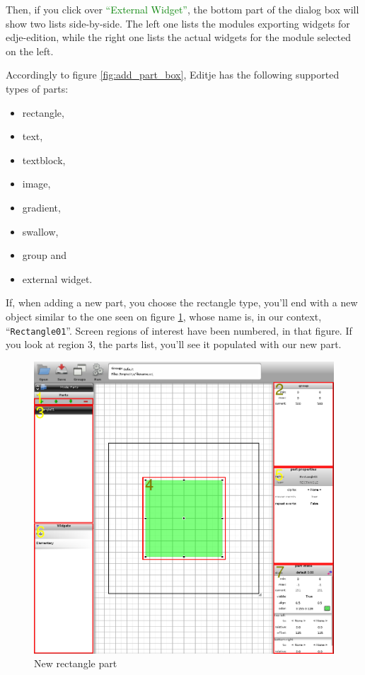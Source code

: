 \documentclass[a4paper]{profusion}
\newcommand{\GUIButton}[1]{\textcolor{green}{#1}} %
\begin{document}
Then, if you click over \GUIButton{``External Widget''}, the bottom
part of the dialog box will show two lists side-by-side. The left one
lists the modules exporting widgets for edje-edition, while the right
one lists the actual widgets for the module selected on the left.

Accordingly to figure \ref{fig:add_part_box}, Editje has the following
supported types of parts:

\begin{itemize}
  \item rectangle,
  \item text,
  \item textblock,
  \item image,
  \item gradient,
  \item swallow,
  \item group and
  \item external widget.
\end{itemize}

If, when adding a new part, you choose the rectangle type, you'll end
with a new object similar to the one seen on figure
\ref{fig:new_rectangle}, whose name is, in our context,
``\texttt{Rectangle01}''. Screen regions of interest have been
numbered, in that figure. If you look at region 3, the parts list,
you'll see it populated with our new part.

\begin{figure}[h!]
  \centering
  \includegraphics[width=1.0\textwidth]{images/new_rectangle_numbers.png}
  \caption{New rectangle part}
  \label{fig:new_rectangle}
\end{figure}
\end{document}
